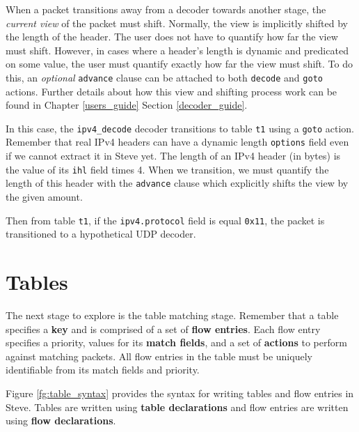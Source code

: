 When a packet transitions away from a decoder towards another stage, the \textit{current view} of the packet must shift. Normally, the view is implicitly shifted by the length of the header. The user does not have to quantify how far the view must shift. However, in cases where a header's length is dynamic and predicated on some value, the user must quantify exactly how far the view must shift. To do this, an \textit{optional} \texttt{advance} clause can be attached to both \texttt{decode} and \texttt{goto} actions. Further details about how this view and shifting process work can be found in Chapter \ref{users_guide} Section \ref{decoder_guide}.

In this case, the \texttt{ipv4\_decode} decoder transitions to table \texttt{t1} using a \texttt{goto} action. Remember that real IPv4 headers can have a dynamic length \texttt{options} field even if we cannot extract it in Steve yet. The length of an IPv4 header (in bytes) is the value of its \texttt{ihl} field times 4. When we transition, we must quantify the length of this header with the \texttt{advance} clause which explicitly shifts the view by the given amount.

Then from table \texttt{t1}, if the \texttt{ipv4.protocol} field is equal \texttt{0x11}, the packet is transitioned to a hypothetical UDP decoder.

\section{Tables} \label{table_tut}

The next stage to explore is the table matching stage. Remember that a table specifies a \textbf{key} and is comprised of a set of \textbf{flow entries}. Each flow entry specifies a priority, values for its \textbf{match fields}, and a set of \textbf{actions} to perform against matching packets. All flow entries in the table must be uniquely identifiable from its match fields and priority.

Figure \ref{fg:table_syntax} provides the syntax for writing tables and flow entries in Steve. Tables are written using \textbf{table declarations} and flow entries are written using \textbf{flow declarations}.

